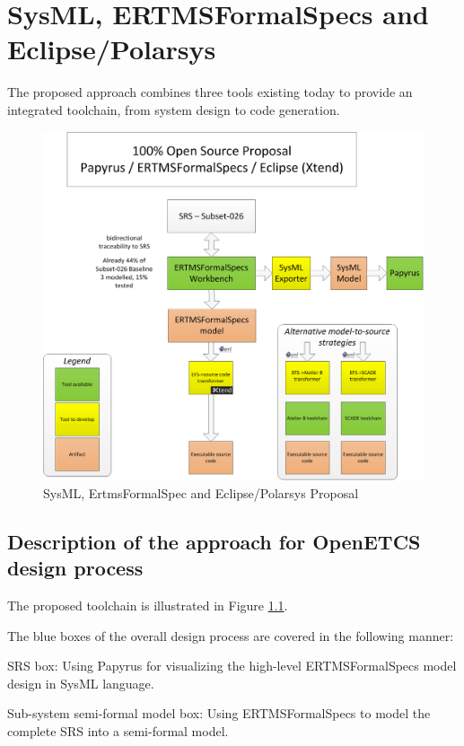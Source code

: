 \chapter{SysML, ERTMSFormalSpecs and Eclipse/Polarsys}
\label{sec:sysML-EFS}

The proposed approach combines three tools existing today to provide an integrated toolchain, from system design 
to code generation.

\begin{figure}[b!]
	\centering
		\includegraphics[width=\textwidth]{images/ERTMSFormalSpecsProposal_V2.png}
		\caption{SysML, ErtmsFormalSpec and Eclipse/Polarsys Proposal}
	\label{fig:ERTMSFormalSpecsProposal}
\end{figure}

\section{Description of the approach for OpenETCS design process}

The proposed toolchain is illustrated in Figure \ref{fig:ERTMSFormalSpecsProposal}.

The blue boxes of the overall design process are covered in the following manner:

SRS box: Using Papyrus for visualizing the high-level ERTMSFormalSpecs model design in SysML language. 

Sub-system semi-formal model box: Using ERTMSFormalSpecs to model the complete SRS into a semi-formal model.

